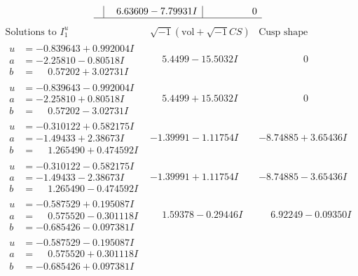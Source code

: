 \documentclass[1p]{elsarticle_modified}
\theoremstyle{definition}
\newcommand{\I}{\sqrt{-1}}
\begin{document}
$$\begin{array}{c|c|c}
 & \phantom{-}6.63609 - 7.79931 I & \phantom{-0.000000 } 0\\
 \hline 
 \end{array}$$\newpage$$\begin{array}{c|c|c}  
\text{Solutions to }I^u_{1}& \I (\text{vol} + \sqrt{-1}CS) & \text{Cusp shape}\\
 \hline 
\begin{aligned}
u &= -0.839643 + 0.992004 I \\
a &= -2.25810 - 0.80518 I \\
b &= \phantom{-}0.57202 + 3.02731 I\end{aligned}
 & \phantom{-}5.4499 - 15.5032 I & \phantom{-0.000000 } 0 \\ \hline\begin{aligned}
u &= -0.839643 - 0.992004 I \\
a &= -2.25810 + 0.80518 I \\
b &= \phantom{-}0.57202 - 3.02731 I\end{aligned}
 & \phantom{-}5.4499 + 15.5032 I & \phantom{-0.000000 } 0 \\ \hline\begin{aligned}
u &= -0.310122 + 0.582175 I \\
a &= -1.49433 + 2.38673 I \\
b &= \phantom{-}1.265490 + 0.474592 I\end{aligned}
 & -1.39991 - 1.11754 I & -8.74885 + 3.65436 I \\ \hline\begin{aligned}
u &= -0.310122 - 0.582175 I \\
a &= -1.49433 - 2.38673 I \\
b &= \phantom{-}1.265490 - 0.474592 I\end{aligned}
 & -1.39991 + 1.11754 I & -8.74885 - 3.65436 I \\ \hline\begin{aligned}
u &= -0.587529 + 0.195087 I \\
a &= \phantom{-}0.575520 - 0.301118 I \\
b &= -0.685426 - 0.097381 I\end{aligned}
 & \phantom{-}1.59378 - 0.29446 I & \phantom{-}6.92249 - 0.09350 I \\ \hline\begin{aligned}
u &= -0.587529 - 0.195087 I \\
a &= \phantom{-}0.575520 + 0.301118 I \\
b &= -0.685426 + 0.097381 I\end{aligned}

\end{array}$$
\end{document}
